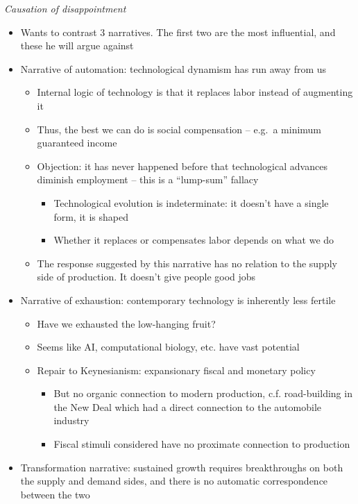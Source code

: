 \emph{Causation of disappointment}

\begin{itemize}
\tightlist
\item
  Wants to contrast 3 narratives. The first two are the most
  influential, and these he will argue against
\item
  Narrative of automation: technological dynamism has run away from us

  \begin{itemize}
  \tightlist
  \item
    Internal logic of technology is that it replaces labor instead of
    augmenting it
  \item
    Thus, the best we can do is social compensation -- e.g.~a minimum
    guaranteed income
  \item
    Objection: it has never happened before that technological advances
    diminish employment -- this is a ``lump-sum'' fallacy

    \begin{itemize}
    \tightlist
    \item
      Technological evolution is indeterminate: it doesn't have a single
      form, it is shaped
    \item
      Whether it replaces or compensates labor depends on what we do
    \end{itemize}
  \item
    The response suggested by this narrative has no relation to the
    supply side of production. It doesn't give people good jobs
  \end{itemize}
\item
  Narrative of exhaustion: contemporary technology is inherently less
  fertile

  \begin{itemize}
  \tightlist
  \item
    Have we exhausted the low-hanging fruit?
  \item
    Seems like AI, computational biology, etc. have vast potential
  \item
    Repair to Keynesianism: expansionary fiscal and monetary policy

    \begin{itemize}
    \tightlist
    \item
      But no organic connection to modern production, c.f. road-building
      in the New Deal which had a direct connection to the automobile
      industry
    \item
      Fiscal stimuli considered have no proximate connection to
      production
    \end{itemize}
  \end{itemize}
\item
  Transformation narrative: sustained growth requires breakthroughs on
  both the supply and demand sides, and there is no automatic
  correspondence between the two


\end{itemize}
